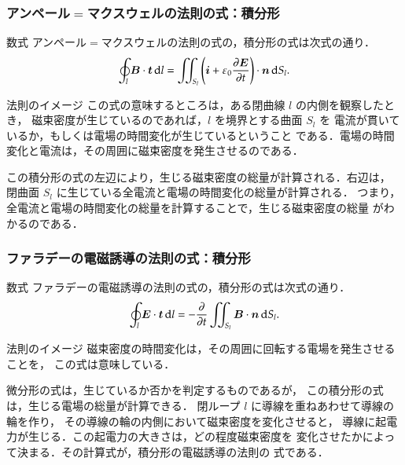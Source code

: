            \subsubsection{アンペール$=$マクスウェルの法則の式：積分形}
            \begin{mysmallsec}{数式}
                アンペール$=$マクスウェルの法則の式の，積分形の式は次式の通り．
                \begin{align}
                    \oint_{l} \boldsymbol{B} \cdot \boldsymbol{t} \,\mathrm{d} l
                    = \int\mspace{-11mu}\int_{S_{l}} \left( \boldsymbol{i} + \varepsilon_{0}\frac{\partial \boldsymbol{E}}{\partial t} \right) \cdot \boldsymbol{n} \,\mathrm{d} S_{l}.
                \end{align}
            \end{mysmallsec}

            \begin{mysmallsec}{法則のイメージ}
                この式の意味するところは，ある閉曲線 $l$ の内側を観察したとき，
                磁束密度が生じているのであれば，$l$ を境界とする曲面 $S_{l}$ を
                電流が貫いているか，もしくは電場の時間変化が生じているということ
                である．電場の時間変化と電流は，その周囲に磁束密度を発生させるのである．

                この積分形の式の左辺により，生じる磁束密度の総量が計算される．右辺は，
                閉曲面 $S_{l}$ に生じている全電流と電場の時間変化の総量が計算される．
                つまり，全電流と電場の時間変化の総量を計算することで，生じる磁束密度の総量
                がわかるのである．
            \end{mysmallsec}

            \subsubsection{ファラデーの電磁誘導の法則の式：積分形}
            \begin{mysmallsec}{数式}
                ファラデーの電磁誘導の法則の式の，積分形の式は次式の通り．
                \begin{align}
                    \oint_{l} \boldsymbol{E} \cdot \boldsymbol{t} \,\mathrm{d} l
                    = -\frac{\partial}{\partial t} \int\mspace{-11mu}\int_{S_{l}} \boldsymbol{B} \cdot \boldsymbol{n} \,\mathrm{d} S_{l}.
                \end{align}
            \end{mysmallsec}

            \begin{mysmallsec}{法則のイメージ}
                磁束密度の時間変化は，その周囲に回転する電場を発生させることを，
                この式は意味している．

                微分形の式は，生じているか否かを判定するものであるが，
                この積分形の式は，生じる電場の総量が計算できる．
                閉ループ $l$ に導線を重ねあわせて導線の輪を作り，
                その導線の輪の内側において磁束密度を変化させると，
                導線に起電力が生じる．この起電力の大きさは，どの程度磁束密度を
                変化させたかによって決まる．その計算式が，積分形の電磁誘導の法則の
                式である．
            \end{mysmallsec}
